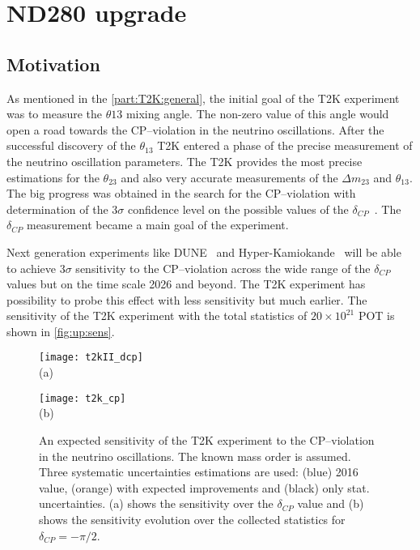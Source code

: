 \documentclass[../main.tex]{subfiles}
\begin{document}
\part{ND280 upgrade}
\label{pt:up}

\chapter{Motivation}
As mentioned in the \autoref{part:T2K:general}, the initial goal of the T2K experiment was to measure the $\theta{13}$ mixing angle. The non-zero value of this angle would open a road towards the CP--violation in the neutrino oscillations. After the successful discovery of the $\theta_{13}$ T2K entered a phase of the precise measurement of the neutrino oscillation parameters. The T2K provides the most precise estimations for the $\theta_{23}$ and also very accurate measurements of the $\Delta m_{23}$ and $\theta_{13}$. The big progress was obtained in the search for the CP--violation with determination of the 3$\sigma$ confidence level on the possible values of the $\delta_{CP}$~\cite{Abe2020n}. The $\delta_{CP}$ measurement became a main goal of the experiment.

Next generation experiments like DUNE~\cite{Acciarri2016} and Hyper-Kamiokande~\cite{Proto-Collaboration2018} will be able to achieve 3$\sigma$ sensitivity to the CP--violation across the wide range of the $\delta_{CP}$ values but on the time scale 2026 and beyond. The T2K experiment has possibility to probe this effect with less sensitivity but much earlier. The sensitivity of the T2K experiment with the total statistics of $20\times10^{21}$ POT is shown in \autoref{fig:up:sens}.

\begin{figure}[!ht]
  \centering
  \begin{minipage}{0.49\linewidth}
    \centering
    \texttt{[image: t2kII\_dcp]} \\ (a)
  \end{minipage}
  \begin{minipage}{0.49\linewidth}
    \centering
    \texttt{[image: t2k\_cp]} \\ (b)
  \end{minipage}
    \caption{An expected sensitivity of the T2K experiment to the CP--violation in the neutrino oscillations. The known mass order is assumed. Three systematic uncertainties estimations are used: (blue) 2016 value, (orange) with expected improvements and (black) only stat. uncertainties. (a) shows the sensitivity over the $\delta_{CP}$ value and (b) shows the sensitivity evolution over the collected statistics for $\delta_{CP}=-\pi/2$.}
    \label{fig:up:sens}
\end{figure}
\end{document}
